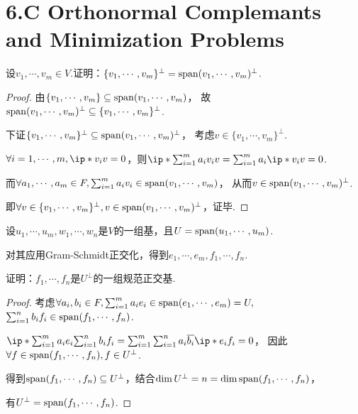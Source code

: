 \section{6.C Orthonormal Complemants and Minimization Problems}

\begin{problem}[1]\label{6.C.1}
    设\(v_1,\cdots,v_m \in V\).证明：\(\{v_1,\cdots,v_m\}^\bot=\operatorname{span}(v_1,\cdots,v_m)^\bot\).
\end{problem}

\begin{proof}
    由\(\{v_1,\cdots,v_m\} \subseteq \operatorname{span}(v_1,\cdots,v_m)\)，
    故\(\operatorname{span}(v_1,\cdots,v_m)^\bot \subseteq \{v_1,\cdots,v_m\}^\bot\).
    
    下证\(\{v_1,\cdots,v_m\}^\bot \subseteq \operatorname{span}(v_1,\cdots,v_m)^\bot\)，
    考虑\(v \in \{v_1,\cdots,v_m\}^\bot\).
    
    \(\forall i=1,\cdots,m,\ip*{v_i}{v}=0\)，则\(\ip*{\sum_{i=1}^m a_iv_i}{v}=\sum_{i=1}^m a_i\ip*{v_i}{v}=0\).
    
    而\(\forall a_1,\cdots,a_m \in F,\sum_{i=1}^m a_iv_i \in \operatorname{span}(v_1,\cdots,v_m)\)，
    从而\(v \in \operatorname{span}(v_1,\cdots,v_m)^\bot\).
    
    即\(\forall v \in \{v_1,\cdots,v_m\}^\bot,v \in \operatorname{span}(v_1,\cdots,v_m)^\bot\)，证毕.    
\end{proof}

\begin{problem}[3]\label{6.C.3}
    设\(u_1,\cdots,u_m,w_1,\cdots,w_n\)是\(V\)的一组基，且\(U=\operatorname{span}(u_1,\cdots,u_m)\).

    对其应用Gram-Schmidt正交化，得到\(e_1,\cdots,e_m,f_1,\cdots,f_n\).
    
    证明：\(f_1,\cdots,f_n\)是\(U^\bot\)的一组规范正交基.
\end{problem}

\begin{proof}
    考虑\(\forall a_i,b_i \in F,\sum_{i=1}^m a_ie_i \in \operatorname{span}(e_1,\cdots,e_m)=U,\)
    \(\sum_{i=1}^n b_if_i \in \operatorname{span}(f_1,\cdots,f_n)\).
    
    \(\ip*{\sum_{i=1}^m a_ie_i}{\sum_{i=1}^n b_if_i}=\sum_{i=1}^m \sum_{i=1}^n a_i\ol{b_i} \ip*{e_i}{f_i}=0\)，
    因此\(\forall f \in \operatorname{span}(f_1,\cdots,f_n), f\in U^\bot\).
    
    得到\(\operatorname{span}(f_1,\cdots,f_n) \subseteq U^\bot\)，结合\(\dim U^\bot=n=\dim \operatorname{span}(f_1,\cdots,f_n)\)，
    
    有\(U^\bot=\operatorname{span}(f_1,\cdots,f_n)\).
\end{proof}

